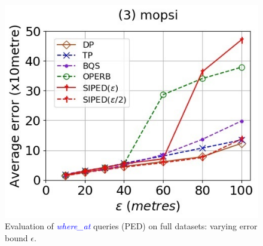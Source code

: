 \begin{figure}[tb!]
	\includegraphics[scale = 0.400]{Figures/Exp-where-PED-error-epsilon-mopsi.jpg}
	\vspace{-1ex}
	\caption{\small Evaluation of \textcolor{blue}{\emph{where\_at}} queries (PED) on full datasets: varying error bound $\epsilon$.}
	\label{fig:query-ped-epsilon}
	\vspace{-1.0ex}
\end{figure}

